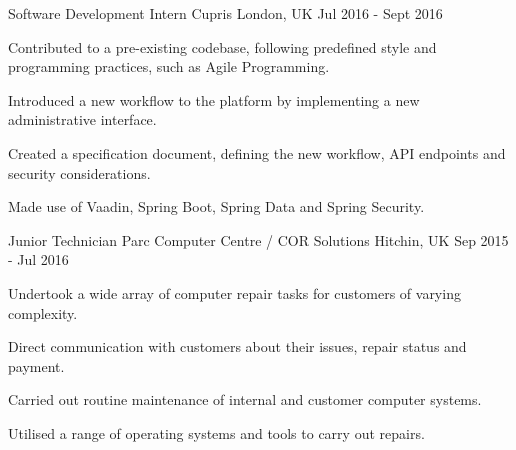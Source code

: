 \begin{cventries}
    \cventry
    {Software Development Intern} %
    {Cupris} %
    {London, UK} %
    {Jul 2016 - Sept 2016} %
    {
        \begin{cvitems} %
            \item {Contributed to a pre-existing codebase, following predefined style and programming practices, such as Agile Programming.}
            \item {Introduced a new workflow to the platform by implementing a new administrative interface.}
            \item {Created a specification document, defining the new workflow, API endpoints and security considerations.}
            \item {Made use of Vaadin, Spring Boot, Spring Data and Spring Security.}
        \end{cvitems}
    }

    \cventry
    {Junior Technician} %
    {Parc Computer Centre / COR Solutions} %
    {Hitchin, UK} %
    {Sep 2015 - Jul 2016} %
    {
        \begin{cvitems} %
            \item {Undertook a wide array of computer repair tasks for customers of varying complexity.}
            \item {Direct communication with customers about their issues, repair status and payment.}
            \item {Carried out routine maintenance of internal and customer computer systems.}
            \item {Utilised a range of operating systems and tools to carry out repairs.}
        \end{cvitems}
    }
\end{cventries}
